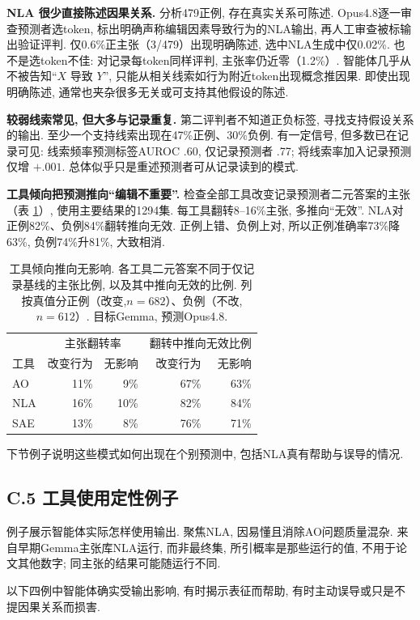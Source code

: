 \textbf{NLA 很少直接陈述因果关系.} 分析479正例, 存在真实关系可陈述. Opus4.8逐一审查预测者选token, 标出明确声称编辑因素导致行为的NLA输出, 再人工审查被标输出验证评判. 仅0.6\%正主张（3/479）出现明确陈述, 选中NLA生成中仅0.02\%. 也不是选token不佳: 对记录每token同样评判, 主张率仍近零（1.2\%）. 智能体几乎从不被告知“$X$ 导致 $Y$”, 只能从相关线索如行为附近token出现概念推因果. 即使出现明确陈述, 通常也夹杂很多无关或可支持其他假设的陈述.

\textbf{较弱线索常见, 但大多与记录重复.} 第二评判者不知道正负标签, 寻找支持假设关系的输出. 至少一个支持线索出现在47\%正例、30\%负例. 有一定信号, 但多数已在记录可见: 线索频率预测标签AUROC .60, 仅记录预测者 .77; 将线索率加入记录预测仅增 $+.001$. 总体似乎只是重述预测者可从记录读到的模式.

\textbf{工具倾向把预测推向“编辑不重要”.} 检查全部工具改变记录预测者二元答案的主张（表 \ref{chive-tab:flipgrid}）, 使用主要结果的1294集. 每工具翻转8--16\%主张, 多推向“无效”. NLA对正例82\%、负例84\%翻转推向无效. 正例上错、负例上对, 所以正例准确率73\%降63\%, 负例74\%升81\%, 大致相消.
\begin{table}[ht]\centering
\begin{tabular}{lrrrr}\toprule
 & \multicolumn{2}{c}{主张翻转率} & \multicolumn{2}{c}{翻转中推向无效比例}\\
工具 & 改变行为 & 无影响 & 改变行为 & 无影响\\\midrule
AO & 11\% & 9\% & 67\% & 63\%\\
NLA & 16\% & 10\% & 82\% & 84\%\\
SAE & 13\% & 8\% & 76\% & 71\%\\\bottomrule
\end{tabular}
\caption{工具倾向推向无影响. 各工具二元答案不同于仅记录基线的主张比例, 以及其中推向无效的比例. 列按真值分正例（改变,$n=682$）、负例（不改,$n=612$）. 目标Gemma, 预测Opus4.8.}\label{chive-tab:flipgrid}
\end{table}
下节例子说明这些模式如何出现在个别预测中, 包括NLA真有帮助与误导的情况.

\subsection*{C.5 工具使用定性例子}
例子展示智能体实际怎样使用输出. 聚焦NLA, 因易懂且消除AO问题质量混杂. 来自早期Gemma主张库NLA运行, 而非最终集, 所引概率是那些运行的值, 不用于论文其他数字; 同主张的结果可能随运行不同.

以下四例中智能体确实受输出影响, 有时揭示表征而帮助, 有时主动误导或只是不提因果关系而损害.

